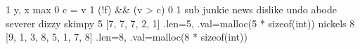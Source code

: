 \expandafter\def\csname cpp:swap\endcsname{1}
\expandafter\def\csname cpp:PARAM(x,y)\endcsname{y, x}
\expandafter\def\csname cpp:comp\endcsname{max}
\expandafter\def\csname cpp:INIT\endcsname{0}
\expandafter\def\csname cpp:PROCESS(c,v)\endcsname{c = v}
\expandafter\def\csname cpp:NOT\endcsname{1}
\expandafter\def\csname cpp:COND(f,c,v)\endcsname{(!f) && (v > c)}
\expandafter\def\csname cpp:FALSE\endcsname{0}
\expandafter\def\csname cpp:TRUE\endcsname{1}
\expandafter\def\csname cpp:join\endcsname{sub}
\expandafter\def\csname cpp:FORALLIN\endcsname{junkie}
\expandafter\def\csname cpp:A\endcsname{news}
\expandafter\def\csname cpp:B\endcsname{dislike}
\expandafter\def\csname cpp:C\endcsname{undo}
\expandafter\def\csname cpp:I\endcsname{abode}
\expandafter\def\csname cpp:J\endcsname{severer}
\expandafter\def\csname cpp:F\endcsname{dizzy}
\expandafter\def\csname cpp:U\endcsname{skimpy}
\expandafter\def\csname cpp:TABU_LEN\endcsname{5}
\expandafter\def\csname cpp:TABU_VAL\endcsname{[7, 7, 7, 2, 1]}
\expandafter\def\csname cpp:TABU\endcsname{{.len=5, .val=malloc(5 * sizeof(int))}}
\expandafter\def\csname cpp:V\endcsname{nickels}
\expandafter\def\csname cpp:TABV_LEN\endcsname{8}
\expandafter\def\csname cpp:TABV_VAL\endcsname{[9, 1, 3, 8, 5, 1, 7, 8]}
\expandafter\def\csname cpp:TABV\endcsname{{.len=8, .val=malloc(8 * sizeof(int))}}

\def\C#1{\csname cpp:#1\endcsname}

